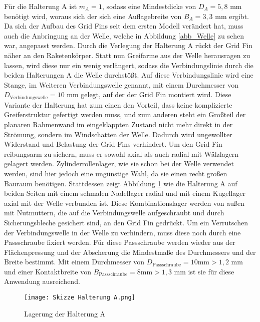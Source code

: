 Für die Halterung A ist $m_A =1$, sodass eine Mindestdicke von $D_A =5,8$ mm benötigt wird, woraus sich der sich eine Auflagebreite von $B_A = 3,3$ mm ergibt. Da sich der Aufbau des Grid Fins seit dem ersten Modell verändert hat, muss auch die Anbringung an der Welle, welche in Abbildung \ref{abb_Welle} zu sehen war, angepasst werden. Durch die Verlegung der Halterung A rückt der Grid Fin näher an den Raketenkörper. Statt nun Greifarme aus der Welle herausragen zu lassen, wird diese nur ein wenig verlängert, sodass die Verbindungslinie durch die beiden Halterungen A die Welle durchstößt. Auf diese Verbindungslinie wird eine Stange, im Weiteren Verbindungswelle genannt, mit einem Durchmesser von $D_\mathrm{Verbindungswelle} = 10$ mm gelegt, auf der der Grid Fin montiert wird. Diese Variante der Halterung hat zum einen den Vorteil, dass keine komplizierte Greiferstruktur gefertigt werden muss, und zum anderen steht ein Großteil der planaren Rahmenwand im eingeklappten Zustand nicht mehr direkt in der Strömung, sondern im Windschatten der Welle. Dadurch wird ungewollter Widerstand und Belastung der Grid Fins verhindert. Um den Grid Fin reibungsarm zu sichern, muss er sowohl axial als auch radial mit Wälzlagern gelagert werden. Zylinderrollenlager, wie sie schon bei der Welle verwendet werden, sind hier jedoch eine ungünstige Wahl, da sie einen recht großen Bauraum benötigen. Stattdessen zeigt Abbildung \ref{abb_Lager_HA} wie die Halterung A auf beiden Seiten mit einem schmalen Nadellager radial  und mit einem Kugellager axial mit der Welle verbunden ist. Diese Kombinationslager werden von außen mit Nutmuttern, die auf die Verbindungswelle aufgeschraubt und durch Sicherungsbleche gesichert sind, an den Grid Fin gedrückt. Um ein Verrutschen der Verbindungswelle in der Welle zu verhindern, muss diese noch durch eine Passschraube fixiert werden. Für diese Passschraube werden wieder aus der Flächenpressung und der Abscherung die Mindestmaße des Durchmessers und der Breite bestimmt. Mit einem Durchmesser von $D_\mathrm{Passschraube} = 10\mathrm{ mm}> 1,2$ mm und einer Kontaktbreite von $B_\mathrm{Passschraube} = 8\mathrm{ mm}> 1,3$ mm ist sie für diese Anwendung ausreichend.
\begin{figure}[h] 
	\centering
	\texttt{[image: Skizze Halterung A.png]}
	\caption{Lagerung der Halterung A}
	\label{abb_Lager_HA}
\end{figure}\\
